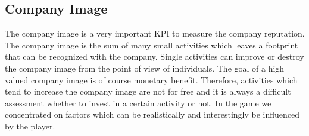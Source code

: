 \subsection{Company Image}
The company image is a very important KPI to measure the company reputation. The company image is the sum of many small activities which leaves a footprint that can be recognized with the company. Single activities can improve or destroy the company image from the point of view of individuals. The goal of a high valued company image is of course monetary benefit. Therefore, activities which tend to increase the company image are not for free and it is always a difficult assessment whether to invest in a certain activity or not. In the game we concentrated on factors which can be realistically and interestingly be influenced by the player.

